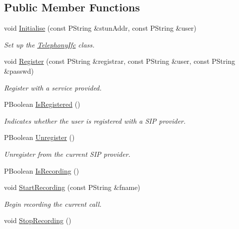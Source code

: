\subsection*{Public Member Functions}
\begin{CompactItemize}
\item 
void \hyperlink{classTelephonyIfc_f9e1672e2302bd86c082070db8cf9b9f}{Initialise} (const PString \&stunAddr, const PString \&user)
\begin{CompactList}\small\item\em Set up the \hyperlink{classTelephonyIfc}{TelephonyIfc} class. \item\end{CompactList}\item 
void \hyperlink{classTelephonyIfc_ddbfc63168d5e70fd4f83469de4aabb7}{Register} (const PString \&registrar, const PString \&user, const PString \&passwd)
\begin{CompactList}\small\item\em Register with a service provided. \item\end{CompactList}\item 
\hypertarget{classTelephonyIfc_20e9a9dd2df97b6c50aa1e19191c890a}{
PBoolean \hyperlink{classTelephonyIfc_20e9a9dd2df97b6c50aa1e19191c890a}{IsRegistered} ()}
\label{classTelephonyIfc_20e9a9dd2df97b6c50aa1e19191c890a}

\begin{CompactList}\small\item\em Indicates whether the user is registered with a SIP provider. \item\end{CompactList}\item 
\hypertarget{classTelephonyIfc_957da4a7936c3672a48f0fa93f655676}{
PBoolean \hyperlink{classTelephonyIfc_957da4a7936c3672a48f0fa93f655676}{Unregister} ()}
\label{classTelephonyIfc_957da4a7936c3672a48f0fa93f655676}

\begin{CompactList}\small\item\em Unregister from the current SIP provider. \item\end{CompactList}\item 
PBoolean \hyperlink{classTelephonyIfc_4acdd44e7af7967ed53cdf9d47dc0c27}{IsRecording} ()
\item 
void \hyperlink{classTelephonyIfc_2cd8176d99232038fbe8718417135b07}{StartRecording} (const PString \&fname)
\begin{CompactList}\small\item\em Begin recording the current call. \item\end{CompactList}\item 
\hypertarget{classTelephonyIfc_14352867be8fe5f0fcf501701e9052b2}{
void \hyperlink{classTelephonyIfc_14352867be8fe5f0fcf501701e9052b2}{StopRecording} ()}
\label{classTelephonyIfc_14352867be8fe5f0fcf501701e9052b2}


\end{CompactItemize}
